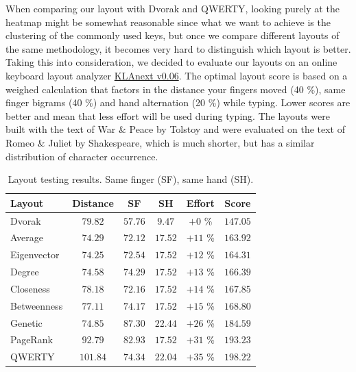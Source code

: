 \documentclass[9pt,twocolumn,twoside]{pnas-report}
\begin{document}
When comparing our layout with Dvorak and QWERTY, looking purely at the heatmap might be somewhat reasonable since what we want to achieve is the clustering of the commonly used keys, but once we compare different layouts of the same methodology, it becomes very hard to distinguish which layout is better.
Taking this into consideration, we decided to evaluate our layouts on an online keyboard layout analyzer \href{https://klanext.keyboard-design.com/#/main}{KLAnext v0.06}.
The optimal layout score is based on a weighed calculation that factors in the distance your fingers moved (40 \%), same finger bigrams (40 \%) and hand alternation (20 \%) while typing.
Lower scores are better and mean that less effort will be used during typing.
The layouts were built with the text of War \& Peace by Tolstoy and were evaluated on the text of Romeo \& Juliet by Shakespeare, which is much shorter, but has a similar distribution of character occurrence. 

\begin{table}[t]\centering%
	\caption{Layout testing results. Same finger (SF), same hand (SH).}
	\begin{tabular}{lccccc}\toprule
        Layout      & Distance & SF      & SH      & Effort   & Score    \\\midrule
        Dvorak      & $79.82$  & $57.76$ & $9.47$  & $+0$ \%  & $147.05$ \\
        Average     & $74.29$  & $72.12$ & $17.52$ & $+11$ \% & $163.92$ \\
        Eigenvector & $74.25$  & $72.54$ & $17.52$ & $+12$ \% & $164.31$ \\
        Degree      & $74.58$  & $74.29$ & $17.52$ & $+13$ \% & $166.39$ \\
        Closeness   & $78.18$  & $72.16$ & $17.52$ & $+14$ \% & $167.85$ \\
        Betweenness & $77.11$  & $74.17$ & $17.52$ & $+15$ \% & $168.80$ \\
        Genetic     & $74.85$  & $87.30$ & $22.44$ & $+26$ \% & $184.59$ \\
        PageRank    & $92.79$  & $82.93$ & $17.52$ & $+31$ \% & $193.23$ \\
        QWERTY      & $101.84$ & $74.34$ & $22.04$ & $+35$ \% & $198.22$ \\\bottomrule
	\end{tabular}
	\label{tbl:scores}
\end{table}
\end{document}
